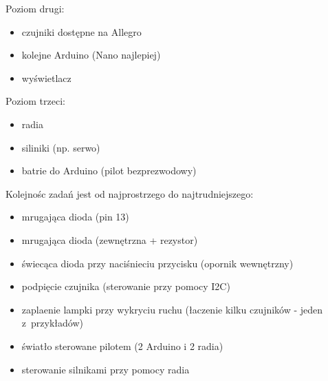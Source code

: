 Poziom drugi:
\begin{itemize}
\item czujniki dostępne na Allegro
\item kolejne Arduino (Nano najlepiej)
\item wyświetlacz
 \end{itemize}

Poziom trzeci:
\begin{itemize}
\item radia
\item siliniki (np. serwo)
\item batrie do Arduino (pilot bezprezwodowy)
\end{itemize}
        
Kolejnośc zadań jest od najprostrzego do najtrudniejszego:
 \begin{itemize}
\item mrugająca dioda (pin 13)
\item mrugająca dioda (zewnętrzna + rezystor)
\item świecąca dioda przy naciśnieciu przycisku (opornik wewnętrzny)
\item podpięcie czujnika (sterowanie przy pomocy I2C)
\item zaplaenie lampki przy wykryciu ruchu (łaczenie kilku czujników - jeden z~przykładów)
\item światło sterowane pilotem (2 Arduino i 2 radia)
\item sterowanie silnikami przy pomocy radia
 \end{itemize}
